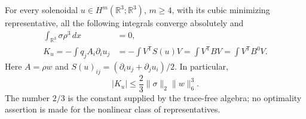 \begin{lemma}
\label{sd:cancellation}
For every solenoidal $u\in H^m(\mathbb R^3;\mathbb R^3)$, $m\ge4$,
with its cubic minimizing representative, all the following integrals
converge absolutely and
\begin{align}
 \int_{\mathbb R^3}\sigma\rho^3\,dx&=0,\label{sd:scalar}\\
 K_u=-\int q_j A_i\partial_i u_j
 &=-\int V^{\mathsf T}S(u)V
   =\int V^{\mathsf T}BV
   =\int V^{\mathsf T}B^0V.\label{sd:signed}
\end{align}
Here $A=\rho w$ and $S(u)_{ij}=(\partial_i u_j+\partial_j u_i)/2$.
In particular,
\begin{equation}\label{sd:sharp-entry}
 |K_u|\le\frac23\|\sigma\|_2\|w\|_6^3.
\end{equation}
The number $2/3$ is the constant supplied by the trace-free algebra;
no optimality assertion is made for the nonlinear class of representatives.
\end{lemma}
